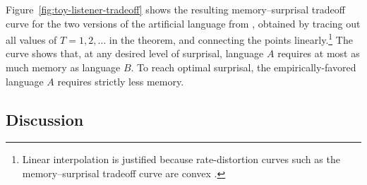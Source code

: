 Figure~\ref{fig:toy-listener-tradeoff} shows the resulting memory--surprisal tradeoff curve for the two versions of the artificial language from \cite{fedzechkina-human-2017}, obtained by tracing out all values of $T=1, 2, \dots$ in the theorem, and connecting the points linearly.\footnote{Linear interpolation is justified because rate-distortion curves such as the memory--surprisal tradeoff curve are convex \citep{berger2003rate}.}
The curve shows that, at any desired level of surprisal, language $A$ requires at most as much memory as language $B$.
To reach optimal surprisal, the empirically-favored language $A$ requires strictly less memory.







%
%
%
%
%
%
%
%
%
%
%




\subsection{Discussion}

